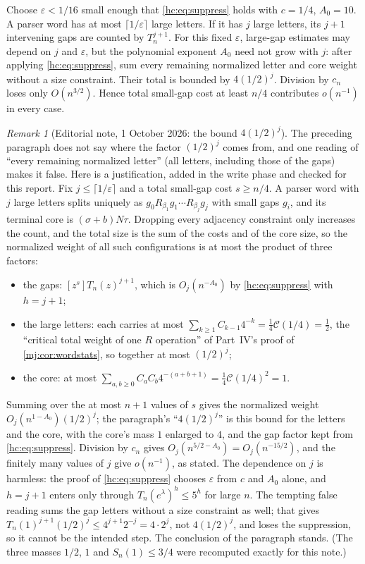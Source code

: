 \documentclass[11pt,a4paper]{article}
\theoremstyle{definition}\newaliascnt{definition}{theorem}
\theoremstyle{remark}\newaliascnt{remark}{theorem}
\newtheorem{remark}[remark]{Remark}
\newcommand{\Cat}{\mathcal C}
\begin{document}
Choose $\varepsilon<1/16$ small enough that \eqref{hc:eq:suppress} holds
with $c=1/4$, $A_0=10$. A parser word has at most $\lceil1/\varepsilon\rceil$
large letters. If it has $j$ large letters, its $j+1$ intervening gaps are
counted by $T_n^{j+1}$. For this fixed $\varepsilon$, large-gap estimates may
depend on $j$ and $\varepsilon$, but the polynomial exponent $A_0$ need not
grow with $j$: after applying \eqref{hc:eq:suppress}, sum every remaining
normalized letter and core weight without a size constraint. Their total is
bounded by $4(1/2)^j$. Division by $c_n$ loses only $O(n^{3/2})$. Hence total
small-gap cost at least $n/4$ contributes $o(n^{-1})$ in every case.

\begin{remark}[Editorial note, 1 October 2026: the bound $4(1/2)^j$]
\label{hc:rem:jbound}
The preceding paragraph does not say where the factor $(1/2)^j$ comes from,
and one reading of ``every remaining normalized letter'' (all letters,
including those of the gaps) makes it false. Here is a justification, added
in the write phase and checked for this report. Fix $j\le\lceil1/\varepsilon\rceil$
and a total small-gap cost $s\ge n/4$. A parser word with $j$ large letters
splits uniquely as $g_0R_{\beta_1}g_1\cdots R_{\beta_j}g_j$ with small gaps
$g_i$, and its terminal core is $(\sigma+b)N\tau$. Dropping every adjacency
constraint only increases the count, and the total size is the sum of the
costs and of the core size, so the normalized weight of all such
configurations is at most the product of three factors:
\begin{itemize}
\item the gaps: $[z^s]T_n(z)^{j+1}$, which is $O_j(n^{-A_0})$ by
 \eqref{hc:eq:suppress} with $h=j+1$;
\item the large letters: each carries at most
 $\sum_{k\ge1}C_{k-1}4^{-k}=\tfrac14\Cat(1/4)=\tfrac12$, the ``critical total
 weight of one $R$ operation'' of Part~IV's proof of
 \cref{mj:cor:wordstats}, so together at most $(1/2)^j$;
\item the core: at most $\sum_{a,b\ge0}C_aC_b4^{-(a+b+1)}=\tfrac14\Cat(1/4)^2=1$.
\end{itemize}
Summing over the at most $n+1$ values of $s$ gives the normalized weight
$O_j(n^{1-A_0})(1/2)^j$; the paragraph's ``$4(1/2)^j$'' is this bound for the
letters and the core, with the core's mass $1$ enlarged to $4$, and the gap
factor kept from \eqref{hc:eq:suppress}. Division by $c_n$ gives
$O_j(n^{5/2-A_0})=O_j(n^{-15/2})$, and the finitely many values of $j$ give
$o(n^{-1})$, as stated. The dependence on $j$ is harmless: the proof of
\eqref{hc:eq:suppress} chooses $\varepsilon$ from $c$ and $A_0$ alone, and
$h=j+1$ enters only through $T_n(e^\lambda)^h\le5^h$ for large $n$. The
tempting false reading sums the gap letters without a size constraint as
well; that gives $T_n(1)^{j+1}(1/2)^j\le4^{j+1}2^{-j}=4\cdot2^j$, not
$4(1/2)^j$, and loses the suppression, so it cannot be the intended step.
The conclusion of the paragraph stands. (The three masses $1/2$, $1$ and
$S_n(1)\le3/4$ were recomputed exactly for this note.)
\end{remark}
\end{document}
